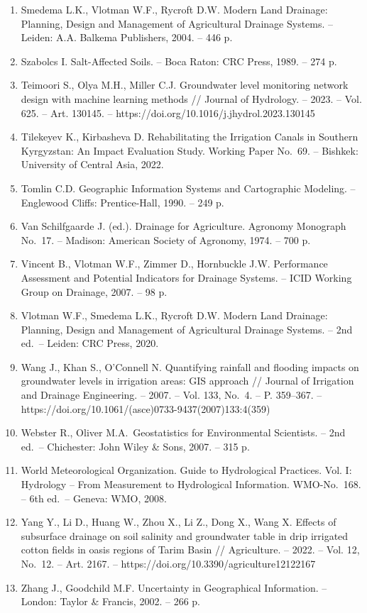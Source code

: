 \begin{enumerate}
  Vol. 55, No.~4. -- P. 1509--1522. --
  https://doi.org/10.13031/2013.42259
\item
  Smedema L.K., Vlotman W.F., Rycroft D.W. Modern Land Drainage:
  Planning, Design and Management of Agricultural Drainage Systems. --
  Leiden: A.A. Balkema Publishers, 2004. -- 446 p.
\item
  Szabolcs I. Salt-Affected Soils. -- Boca Raton: CRC Press, 1989. --
  274 p.
\item
  Teimoori S., Olya M.H., Miller C.J. Groundwater level monitoring
  network design with machine learning methods // Journal of Hydrology.
  -- 2023. -- Vol. 625. -- Art. 130145. --
  https://doi.org/10.1016/j.jhydrol.2023.130145
\item
  Tilekeyev K., Kirbasheva D. Rehabilitating the Irrigation Canals in
  Southern Kyrgyzstan: An Impact Evaluation Study. Working Paper No.~69.
  -- Bishkek: University of Central Asia, 2022.
\item
  Tomlin C.D. Geographic Information Systems and Cartographic Modeling.
  -- Englewood Cliffs: Prentice-Hall, 1990. -- 249 p.
\item
  Van Schilfgaarde J. (ed.). Drainage for Agriculture. Agronomy
  Monograph No.~17. -- Madison: American Society of Agronomy, 1974. --
  700 p.
\item
  Vincent B., Vlotman W.F., Zimmer D., Hornbuckle J.W. Performance
  Assessment and Potential Indicators for Drainage Systems. -- ICID
  Working Group on Drainage, 2007. -- 98 p.
\item
  Vlotman W.F., Smedema L.K., Rycroft D.W. Modern Land Drainage:
  Planning, Design and Management of Agricultural Drainage Systems. --
  2nd ed.~-- Leiden: CRC Press, 2020.
\item
  Wang J., Khan S., O'Connell N. Quantifying rainfall and flooding
  impacts on groundwater levels in irrigation areas: GIS approach //
  Journal of Irrigation and Drainage Engineering. -- 2007. -- Vol. 133,
  No.~4. -- P. 359--367. --
  https://doi.org/10.1061/(asce)0733-9437(2007)133:4(359)
\item
  Webster R., Oliver M.A.~Geostatistics for Environmental Scientists. --
  2nd ed.~-- Chichester: John Wiley \& Sons, 2007. -- 315 p.
\item
  World Meteorological Organization. Guide to Hydrological Practices.
  Vol. I: Hydrology -- From Measurement to Hydrological Information.
  WMO-No.~168. -- 6th ed.~-- Geneva: WMO, 2008.
\item
  Yang Y., Li D., Huang W., Zhou X., Li Z., Dong X., Wang X. Effects of
  subsurface drainage on soil salinity and groundwater table in drip
  irrigated cotton fields in oasis regions of Tarim Basin //
  Agriculture. -- 2022. -- Vol. 12, No.~12. -- Art. 2167. --
  https://doi.org/10.3390/agriculture12122167
\item
  Zhang J., Goodchild M.F. Uncertainty in Geographical Information. --
  London: Taylor \& Francis, 2002. -- 266 p.
\end{enumerate}

